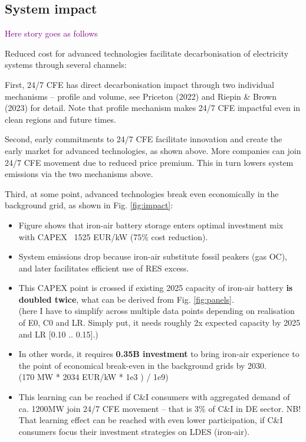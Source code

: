 \documentclass[pdflatex,sn-basic, Numbered]{sn-jnl}%
\theoremstyle{thmstyleone}%
\theoremstyle{thmstyletwo}%
\theoremstyle{thmstylethree}%
\newcommand{\comment}[1]{\textcolor{purple}{#1}}
\begin{document}
\subsection*{System impact}\label{sec3}

\comment{Here story goes as follows}

Reduced cost for advanced technologies facilitate decarbonisation of electricity systems through several channels:

First, 24/7 CFE has direct decarbonisation impact through two individual mechanisms -- profile and volume, see Priceton (2022) and Riepin \& Brown (2023) for detail. Note that profile mechanism makes 24/7 CFE impactful even in clean regions and future times.

Second, early commitments to 24/7 CFE facilitate innovation and create the early market for advanced technologies, as shown above. More companies can join 24/7 CFE movement due to reduced price premium.  This in turn lowers system emissions via the two mechanisms above.

Third, at some point, advanced technologies break even economically in the background grid, as shown in Fig. \ref{fig:impact}:

\begin{itemize}
    \item Figure shows that iron-air battery storage enters optimal investment mix with CAPEX ~1525 EUR/kW (75\% cost reduction).
    \item System emissions drop because iron-air substitute fossil peakers (gas OC), and later facilitates efficient use of RES excess.
    \item This CAPEX point is crossed if existing 2025 capacity of iron-air battery \textbf{is doubled twice}, what can be derived from Fig. \ref{fig:panels}. \\
    (here I have to simplify across multiple data points depending on realisation of E0, C0 and LR. Simply put, it needs roughly 2x expected capacity by 2025 and LR [0.10 .. 0.15].)
    \item In other words, it requires \textbf{0.35B investment} to bring iron-air experience to the point of economical break-even in the background grids by 2030. \\
    (170 MW * 2034 EUR/kW * 1e3 ) / 1e9)
    \item This learning can be reached if C\&I consumers with aggregated demand of ca. 1200MW join 24/7 CFE movement -- that is 3\% of C\&I in DE sector. NB! That learning effect can be reached with even lower participation, if C\&I consumers focus their investment strategies on LDES (iron-air).
\end{itemize}
\end{document}
